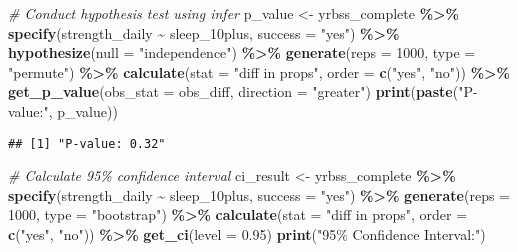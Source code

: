 \documentclass[
]{article}
\newenvironment{Shaded}{\begin{snugshade}}{\end{snugshade}}
\newcommand{\AttributeTok}[1]{\textcolor[rgb]{0.13,0.29,0.53}{#1}}
\newcommand{\CommentTok}[1]{\textcolor[rgb]{0.56,0.35,0.01}{\textit{#1}}}
\newcommand{\DecValTok}[1]{\textcolor[rgb]{0.00,0.00,0.81}{#1}}
\newcommand{\FloatTok}[1]{\textcolor[rgb]{0.00,0.00,0.81}{#1}}
\newcommand{\FunctionTok}[1]{\textcolor[rgb]{0.13,0.29,0.53}{\textbf{#1}}}
\newcommand{\NormalTok}[1]{#1}
\newcommand{\OtherTok}[1]{\textcolor[rgb]{0.56,0.35,0.01}{#1}}
\newcommand{\SpecialCharTok}[1]{\textcolor[rgb]{0.81,0.36,0.00}{\textbf{#1}}}
\newcommand{\StringTok}[1]{\textcolor[rgb]{0.31,0.60,0.02}{#1}}
\begin{document}
\begin{Shaded}
\begin{Highlighting}[]
\CommentTok{\# Conduct hypothesis test using infer}
\NormalTok{p\_value }\OtherTok{\textless{}{-}}\NormalTok{ yrbss\_complete }\SpecialCharTok{\%\textgreater{}\%}
  \FunctionTok{specify}\NormalTok{(strength\_daily }\SpecialCharTok{\textasciitilde{}}\NormalTok{ sleep\_10plus, }\AttributeTok{success =} \StringTok{"yes"}\NormalTok{) }\SpecialCharTok{\%\textgreater{}\%}
  \FunctionTok{hypothesize}\NormalTok{(}\AttributeTok{null =} \StringTok{"independence"}\NormalTok{) }\SpecialCharTok{\%\textgreater{}\%}
  \FunctionTok{generate}\NormalTok{(}\AttributeTok{reps =} \DecValTok{1000}\NormalTok{, }\AttributeTok{type =} \StringTok{"permute"}\NormalTok{) }\SpecialCharTok{\%\textgreater{}\%}
  \FunctionTok{calculate}\NormalTok{(}\AttributeTok{stat =} \StringTok{"diff in props"}\NormalTok{, }\AttributeTok{order =} \FunctionTok{c}\NormalTok{(}\StringTok{"yes"}\NormalTok{, }\StringTok{"no"}\NormalTok{)) }\SpecialCharTok{\%\textgreater{}\%}
  \FunctionTok{get\_p\_value}\NormalTok{(}\AttributeTok{obs\_stat =}\NormalTok{ obs\_diff, }\AttributeTok{direction =} \StringTok{"greater"}\NormalTok{)}
\FunctionTok{print}\NormalTok{(}\FunctionTok{paste}\NormalTok{(}\StringTok{"P{-}value:"}\NormalTok{, p\_value))}
\end{Highlighting}
\end{Shaded}

\begin{verbatim}
## [1] "P-value: 0.32"
\end{verbatim}

\begin{Shaded}
\begin{Highlighting}[]
\CommentTok{\# Calculate 95\% confidence interval}
\NormalTok{ci\_result }\OtherTok{\textless{}{-}}\NormalTok{ yrbss\_complete }\SpecialCharTok{\%\textgreater{}\%}
  \FunctionTok{specify}\NormalTok{(strength\_daily }\SpecialCharTok{\textasciitilde{}}\NormalTok{ sleep\_10plus, }\AttributeTok{success =} \StringTok{"yes"}\NormalTok{) }\SpecialCharTok{\%\textgreater{}\%}
  \FunctionTok{generate}\NormalTok{(}\AttributeTok{reps =} \DecValTok{1000}\NormalTok{, }\AttributeTok{type =} \StringTok{"bootstrap"}\NormalTok{) }\SpecialCharTok{\%\textgreater{}\%}
  \FunctionTok{calculate}\NormalTok{(}\AttributeTok{stat =} \StringTok{"diff in props"}\NormalTok{, }\AttributeTok{order =} \FunctionTok{c}\NormalTok{(}\StringTok{"yes"}\NormalTok{, }\StringTok{"no"}\NormalTok{)) }\SpecialCharTok{\%\textgreater{}\%}
  \FunctionTok{get\_ci}\NormalTok{(}\AttributeTok{level =} \FloatTok{0.95}\NormalTok{)}
\FunctionTok{print}\NormalTok{(}\StringTok{"95\% Confidence Interval:"}\NormalTok{)}
\end{Highlighting}
\end{Shaded}
\end{document}
